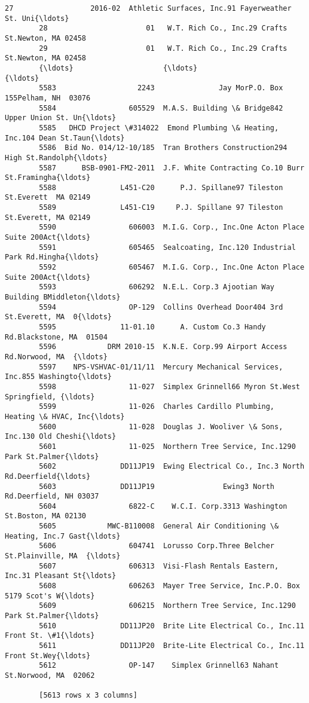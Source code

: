 \documentclass[11pt]{article}
\begin{document}
\begin{Verbatim}[commandchars=\\\{\}]
        27                  2016-02  Athletic Surfaces, Inc.91 Fayerweather St. Uni{\ldots}  
        28                       01   W.T. Rich Co., Inc.29 Crafts St.Newton, MA 02458  
        29                       01   W.T. Rich Co., Inc.29 Crafts St.Newton, MA 02458  
        {\ldots}                     {\ldots}                                                {\ldots}  
        5583                   2243               Jay MorP.O. Box 155Pelham, NH  03076  
        5584                 605529  M.A.S. Building \& Bridge842 Upper Union St. Un{\ldots}  
        5585   DHCD Project \#314022  Emond Plumbing \& Heating, Inc.104 Dean St.Taun{\ldots}  
        5586  Bid No. 014/12-10/185  Tran Brothers Construction294 High St.Randolph{\ldots}  
        5587      BSB-0901-FM2-2011  J.F. White Contracting Co.10 Burr St.Framingha{\ldots}  
        5588               L451-C20      P.J. Spillane97 Tileston St.Everett  MA 02149  
        5589               L451-C19     P.J. Spillane 97 Tileston St.Everett, MA 02149  
        5590                 606003  M.I.G. Corp., Inc.One Acton Place Suite 200Act{\ldots}  
        5591                 605465  Sealcoating, Inc.120 Industrial Park Rd.Hingha{\ldots}  
        5592                 605467  M.I.G. Corp., Inc.One Acton Place Suite 200Act{\ldots}  
        5593                 606292  N.E.L. Corp.3 Ajootian Way Building BMiddleton{\ldots}  
        5594                 OP-129  Collins Overhead Door404 3rd St.Everett, MA  0{\ldots}  
        5595               11-01.10      A. Custom Co.3 Handy Rd.Blackstone, MA  01504  
        5596            DRM 2010-15  K.N.E. Corp.99 Airport Access Rd.Norwood, MA  {\ldots}  
        5597    NPS-VSHVAC-01/11/11  Mercury Mechanical Services, Inc.855 Washingto{\ldots}  
        5598                 11-027  Simplex Grinnell66 Myron St.West Springfield, {\ldots}  
        5599                 11-026  Charles Cardillo Plumbing, Heating \& HVAC, Inc{\ldots}  
        5600                 11-028  Douglas J. Wooliver \& Sons, Inc.130 Old Cheshi{\ldots}  
        5601                 11-025  Northern Tree Service, Inc.1290 Park St.Palmer{\ldots}  
        5602               DD11JP19  Ewing Electrical Co., Inc.3 North Rd.Deerfield{\ldots}  
        5603               DD11JP19                Ewing3 North Rd.Deerfield, NH 03037  
        5604                 6822-C    W.C.I. Corp.3313 Washington St.Boston, MA 02130  
        5605            MWC-B110008  General Air Conditioning \& Heating, Inc.7 Gast{\ldots}  
        5606                 604741  Lorusso Corp.Three Belcher St.Plainville, MA  {\ldots}  
        5607                 606313  Visi-Flash Rentals Eastern, Inc.31 Pleasant St{\ldots}  
        5608                 606263  Mayer Tree Service, Inc.P.O. Box 5179 Scot's W{\ldots}  
        5609                 606215  Northern Tree Service, Inc.1290 Park St.Palmer{\ldots}  
        5610               DD11JP20  Brite Lite Electrical Co., Inc.11 Front St. \#1{\ldots}  
        5611               DD11JP20  Brite-Lite Electrical Co., Inc.11 Front St.Wey{\ldots}  
        5612                 OP-147    Simplex Grinnell63 Nahant St.Norwood, MA  02062  
        
        [5613 rows x 3 columns]
\end{Verbatim}
            
\end{document}
